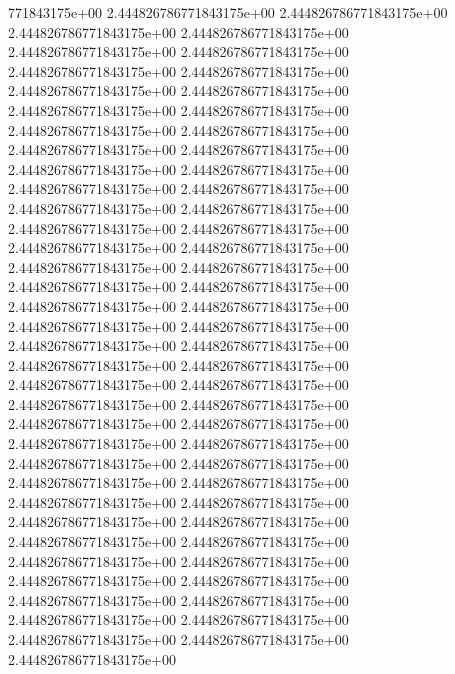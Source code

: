 771843175e+00	2.444826786771843175e+00	2.444826786771843175e+00	2.444826786771843175e+00	2.444826786771843175e+00	2.444826786771843175e+00	2.444826786771843175e+00	2.444826786771843175e+00	2.444826786771843175e+00	2.444826786771843175e+00	2.444826786771843175e+00	2.444826786771843175e+00	2.444826786771843175e+00	2.444826786771843175e+00	2.444826786771843175e+00	2.444826786771843175e+00	2.444826786771843175e+00	2.444826786771843175e+00	2.444826786771843175e+00	2.444826786771843175e+00	2.444826786771843175e+00	2.444826786771843175e+00	2.444826786771843175e+00	2.444826786771843175e+00	2.444826786771843175e+00	2.444826786771843175e+00	2.444826786771843175e+00	2.444826786771843175e+00	2.444826786771843175e+00	2.444826786771843175e+00	2.444826786771843175e+00	2.444826786771843175e+00	2.444826786771843175e+00	2.444826786771843175e+00	2.444826786771843175e+00	2.444826786771843175e+00	2.444826786771843175e+00	2.444826786771843175e+00	2.444826786771843175e+00	2.444826786771843175e+00	2.444826786771843175e+00	2.444826786771843175e+00	2.444826786771843175e+00	2.444826786771843175e+00	2.444826786771843175e+00	2.444826786771843175e+00	2.444826786771843175e+00	2.444826786771843175e+00	2.444826786771843175e+00	2.444826786771843175e+00	2.444826786771843175e+00	2.444826786771843175e+00	2.444826786771843175e+00	2.444826786771843175e+00	2.444826786771843175e+00	2.444826786771843175e+00	2.444826786771843175e+00	2.444826786771843175e+00	2.444826786771843175e+00	2.444826786771843175e+00	2.444826786771843175e+00	2.444826786771843175e+00	2.444826786771843175e+00	2.444826786771843175e+00	2.444826786771843175e+00	2.444826786771843175e+00	2.444826786771843175e+00	2.444826786771843175e+00
